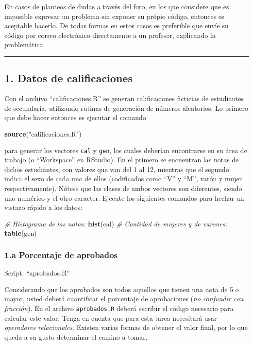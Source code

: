 \documentclass[]{article}
\newenvironment{Shaded}{}{}
\newcommand{\KeywordTok}[1]{\textcolor[rgb]{0.00,0.44,0.13}{\textbf{{#1}}}}
\newcommand{\StringTok}[1]{\textcolor[rgb]{0.25,0.44,0.63}{{#1}}}
\newcommand{\CommentTok}[1]{\textcolor[rgb]{0.38,0.63,0.69}{\textit{{#1}}}}
\newcommand{\NormalTok}[1]{{#1}}
\begin{document}
En casos de planteos de dudas a través del foro, en los que considere
que es imposible expresar un problema sin exponer su própio código,
entonces es aceptable hacerlo. De todas formas en estos casos es
preferible que envíe su código por correo electrónico directamente a un
profesor, explicando la problemática.

\begin{center}\rule{3in}{0.4pt}\end{center}

\subsection{1. Datos de calificaciones}

Con el archivo ``calificaciones.R'' se generan calificaciones ficticias
de estudiantes de secundaria, utilizando rutinas de generación de
números aleatorios. Lo primero que debe hacer entonces es ejecutar el
comando

\begin{Shaded}
\begin{Highlighting}[]
\KeywordTok{source}\NormalTok{(}\StringTok{"calificaciones.R"}\NormalTok{)}
\end{Highlighting}
\end{Shaded}
para generar los vectores \texttt{cal} y \texttt{gen}, los cuales
deberían encontrarse en su área de trabajo (o ``Workspace'' en RStudio).
En el primero se encuentran las notas de dichos estudiantes, con valores
que van del 1 al 12, mientras que el segundo indica el sexo de cada uno
de ellos (codificados como ``V'' y ``M'', varón y mujer
respectivamente). Nótese que las clases de ambos vectores son
diferentes, siendo uno numérico y el otro caracter. Ejecute los
siguientes comandos para hechar un vistazo rápido a los datos:

\begin{Shaded}
\begin{Highlighting}[]
\CommentTok{# Histograma de las notas:}
\KeywordTok{hist}\NormalTok{(cal)}
\CommentTok{# Cantidad de mujeres y de varones:}
\KeywordTok{table}\NormalTok{(gen)}
\end{Highlighting}
\end{Shaded}
\subsubsection{1.a Porcentaje de aprobados}

Script: ``aprobados.R''

Considerando que los aprobados son todos aquellos que tienen una nota de
5 o mayor, usted deberá cuantificar el porcentaje de aprobaciones
(\emph{no confundir con fracción}). En el archivo \texttt{aprobados.R}
deberá escribir el código necesario para calcular este valor. Tenga en
cuenta que para esta tarea necesitará usar \emph{operadores
relacionales}. Existen varias formas de obtener el valor final, por lo
que queda a su gusto determinar el camino a tomar.
\end{document}
